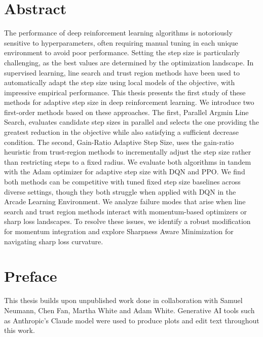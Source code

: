 \chapter*{Abstract} 
The performance of deep reinforcement learning algorithms is notoriously sensitive to hyperparameters, often requiring manual tuning in each unique environment to avoid poor performance. Setting the step size is particularly challenging, as the best values are determined by the optimization landscape. In supervised learning, line search and trust region methods have been used to automatically adapt the step size using local models of the objective, with impressive empirical performance. This thesis presents the first study of these methods for adaptive step size in deep reinforcement learning. We introduce two first-order methods based on these approaches. The first, Parallel Argmin Line Search, evaluates candidate step sizes in parallel and selects the one providing the greatest reduction in the objective while also satisfying a sufficient decrease condition. The second, Gain-Ratio Adaptive Step Size, uses the gain-ratio heuristic from trust-region methods to incrementally adjust the step size rather than restricting steps to a fixed radius. We evaluate both algorithms in tandem with the Adam optimizer for adaptive step size with DQN and PPO. We find both methods can be competitive with tuned fixed step size baselines across diverse settings, though they both struggle when applied with DQN in the Arcade Learning Environment. We analyze failure modes that arise when line search and trust region methods interact with momentum-based optimizers or sharp loss landscapes. To resolve these issues, we identify a robust modification for momentum integration and explore Sharpness Aware Minimization for navigating sharp loss curvature. 

\setcounter{page}{2}
\renewcommand{\thepage}{\roman{page}} %

\chapter*{Preface} 
This thesis builds upon unpublished work done in collaboration with Samuel Neumann, Chen Fan, Martha White and Adam White. Generative AI tools such as Anthropic's Claude model were used to produce plots and edit text throughout this work. 

